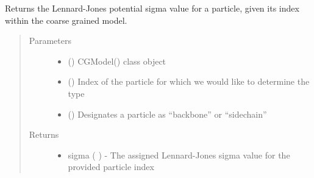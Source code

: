 \documentclass[letterpaper,12pt,english,openany,oneside]{sphinxmanual}
\begin{document}
\begin{fulllineitems}

\begin{fulllineitems}
\label{\detokenize{cg_model:cg_model.cgmodel.CGModel.get_sigma}}
Returns the Lennard-Jones potential sigma value for a particle, given its index within the coarse grained model.
\begin{quote}\begin{description}
\item[{Parameters}] \leavevmode\begin{itemize}
\item {} 
 () \textendash{} CGModel() class object

\item {} 
 () \textendash{} Index of the particle for which we would like to determine the type

\item {} 
 () \textendash{} Designates a particle as “backbone” or “sidechain”

\end{itemize}

\item[{Returns}] \leavevmode
\begin{itemize}
\item {} 
sigma (  ) - The assigned Lennard-Jones sigma value for the provided particle index

\end{itemize}


\end{description}\end{quote}

\end{fulllineitems}



\end{fulllineitems}
\end{document}
